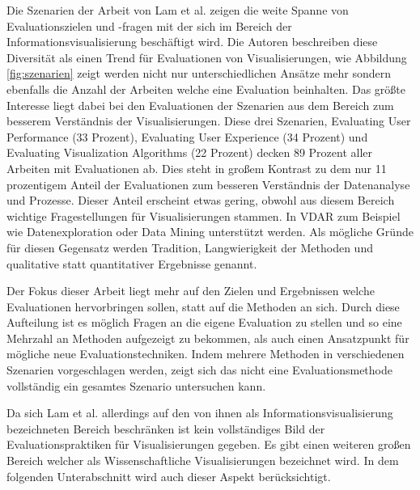 \documentclass[draft=false
              ,paper=a4
              ,twoside=false
              ,fontsize=11pt
              ,headsepline
              ,BCOR10mm
              ,DIV11
              ]{scrbook}
\begin{document}
Die Szenarien der Arbeit von Lam et al. zeigen die weite Spanne von Evaluationszielen und -fragen mit der sich im Bereich der Informationsvisualisierung beschäftigt wird. Die Autoren beschreiben diese Diversität als einen Trend für Evaluationen von Visualisierungen, wie Abbildung \ref{fig:szenarien} zeigt werden nicht nur unterschiedlichen Ansätze mehr sondern ebenfalls die Anzahl der Arbeiten welche eine Evaluation beinhalten. Das größte Interesse liegt dabei bei den Evaluationen der Szenarien aus dem Bereich zum besserem Verständnis der Visualisierungen. Diese drei Szenarien, Evaluating User Performance (33 Prozent), Evaluating User Experience (34 Prozent) und Evaluating Visualization Algorithms (22 Prozent) decken 89 Prozent aller Arbeiten mit Evaluationen ab. Dies steht in großem Kontrast zu dem nur 11 prozentigem Anteil der Evaluationen zum besseren Verständnis der Datenanalyse und Prozesse. Dieser Anteil erscheint etwas gering, obwohl aus diesem Bereich wichtige Fragestellungen für Visualisierungen stammen. In VDAR zum Beispiel wie Datenexploration oder Data Mining unterstützt werden. Als mögliche Gründe für diesen Gegensatz werden Tradition, Langwierigkeit der Methoden und qualitative statt quantitativer Ergebnisse genannt. 

Der Fokus dieser Arbeit liegt mehr auf den Zielen und Ergebnissen welche Evaluationen hervorbringen sollen, statt auf die Methoden an sich. Durch diese Aufteilung ist es möglich Fragen an die eigene Evaluation zu stellen und so eine Mehrzahl an Methoden aufgezeigt zu bekommen, als auch einen Ansatzpunkt für mögliche neue Evaluationstechniken. Indem mehrere Methoden in verschiedenen Szenarien vorgeschlagen werden, zeigt sich das nicht eine Evaluationsmethode vollständig ein gesamtes Szenario untersuchen kann. 

Da sich Lam et al. allerdings auf den von ihnen als Informationsvisualisierung bezeichneten Bereich beschränken ist kein vollständiges Bild der Evaluationspraktiken für Visualisierungen gegeben. Es gibt einen weiteren großen Bereich welcher als Wissenschaftliche Visualisierungen bezeichnet wird. In dem folgenden Unterabschnitt wird auch dieser Aspekt berücksichtigt. 
\end{document}
